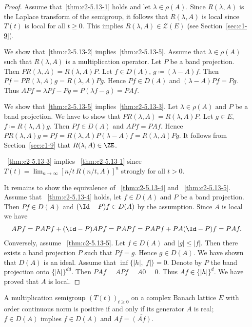 \begin{proof}
Assume that~\ref{thm:c2-5.13-1}   holds and let $\lambda \in \rho(A)$.
Since $R(\lambda,A)$ is the Laplace transform of the semigroup, it follows that $R(\lambda,A)$ is local since $T(t)$ is local for all $t \geq 0$.
This implies $R(\lambda,A) \in \mathcal{Z}(E)$ (see Section~\ref{sec:c1-9}).

We show that~\ref{thm:c2-5.13-2}   implies~\ref{thm:c2-5.13-5}.
Assume that $\lambda \in \rho(A)$ such that $R(\lambda,A)$ is a multiplication operator.
Let $P$ be a band projection.
Then $PR(\lambda,A) = R(\lambda,A)P$.
Let $f \in D(A)$, $g \coloneqq (\lambda-A)f$.
Then $Pf = PR(\lambda,A)g = R(\lambda,A)Pg$.
Hence $Pf \in D(A)$ and $(\lambda-A)Pf = Pg$.
Thus $APf= \lambda Pf - Pg = P(\lambda f - g) = PAf$.

We show that~\ref{thm:c2-5.13-5}   implies~\ref{thm:c2-5.13-3}.
Let $\lambda \in \rho(A)$ and $P$ be a band projection.
We have to show that $PR(\lambda,A) = R(\lambda,A)P$.
Let $g \in E$, $f \coloneqq R(\lambda,A)g$.
Then $Pf \in D(A)$ and $APf = PAf$.
Hence $PR(\lambda,A)g = Pf = R(\lambda,A)P(\lambda-A)f = R(\lambda,A)Pg$.
It follows from Section~\ref{sec:c1-9} 
that $R(\lambda,A) \in \ZE$.

~\ref{thm:c2-5.13-3}   implies ~\ref{thm:c2-5.13-1}   since $T(t) = \lim_{n \to \infty} [n/t\,R(n/t,A)]^{n}$ strongly for all $t > 0$.

It remains to show the equivalence of ~\ref{thm:c2-5.13-4}   and ~\ref{thm:c2-5.13-5}.
Assume that ~\ref{thm:c2-5.13-4}   holds, let $f \in D(A)$ and $P$ be a band projection.
Then $Pf \in D(A)$ and $(\Id-P)f \in D(A)$ by the assumption.
Since $A$ is local we have 
\[
APf = PAPf + (\Id-P)APf = PAPf = PAPf + PA(\Id-P)f = PAf.
\]
Conversely, assume ~\ref{thm:c2-5.13-5}.
Let $f \in D(A)$ and $|g| \leq |f|$.
Then there exists a band projection $P$ such that $Pf = g$.
Hence $g \in D(A)$.
We have shown
that $D(A)$ is an ideal.
Assume that $\inf\{|h|,|f|\} = 0$.
Denote by $P$ the band projection onto $\{|h|\}^{dd}$.
Then $PAf = APf = A0 = 0$.
Thus $Af \in \{|h|\}^{d}$.
We have proved that $A$ is local.
\end{proof}


\begin{corollary}\label{cor:c2-5.14}
%
A multiplication semigroup $(T(t))_{t \geq 0}$ on a complex Banach lattice $E$ with order continuous norm is positive if and only if its generator $A$ is real; \ie $f \in D(A)$ implies $\bar{f} \in D(A)$ and $A\bar{f} = \overline{(Af)}$.
\end{corollary}

